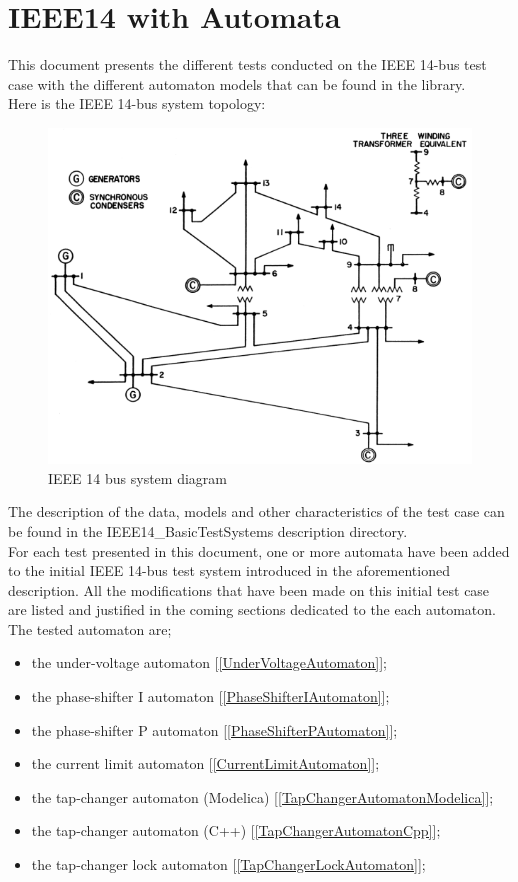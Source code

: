 \documentclass[a4paper, 12pt]{report}
\begin{document}
\chapter{IEEE14 with Automata}

This document presents the different tests conducted on the IEEE 14-bus test case with the different automaton models that can be found in the \Dynawo library.\\

Here is the IEEE 14-bus system topology:
\begin{figure}[H]
  \includegraphics[width=\textwidth]{Single-line-diagram-of-IEEE-14-bus-system.png}
  \caption{IEEE 14 bus system diagram}
\end{figure}

The description of the data, models and other characteristics of the test case can be found in the IEEE14\_BasicTestSystems description directory. \\

For each test presented in this document, one or more automata have been added to the initial IEEE 14-bus test system introduced in the aforementioned description. All the modifications that have been made on this initial test case are listed and justified in the coming sections dedicated to the each automaton.\\

The tested automaton are;
\begin{itemize}
\item the under-voltage automaton [\ref{UnderVoltageAutomaton}];
\item the phase-shifter I automaton [\ref{PhaseShifterIAutomaton}];
\item the phase-shifter P automaton [\ref{PhaseShifterPAutomaton}];
\item the current limit automaton [\ref{CurrentLimitAutomaton}];
\item the tap-changer automaton (Modelica) [\ref{TapChangerAutomatonModelica}];
\item the tap-changer automaton (C++) [\ref{TapChangerAutomatonCpp}];
\item the tap-changer lock automaton [\ref{TapChangerLockAutomaton}];
\end{itemize}
\end{document}
